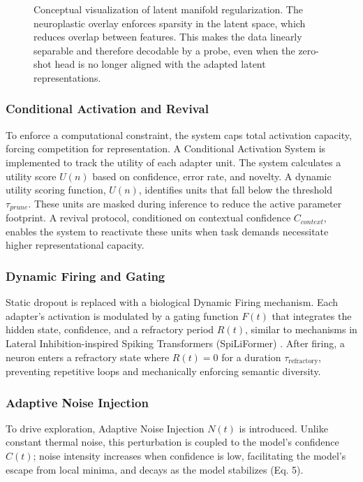 \documentclass[11pt, letterpaper]{article}
\begin{document}
\begin{figure}[htbp]
\centering
\caption{Conceptual visualization of latent manifold regularization. The neuroplastic overlay enforces sparsity in the latent space, which reduces overlap between features. This makes the data linearly separable and therefore decodable by a probe, even when the zero-shot head is no longer aligned with the adapted latent representations.}
\label{fig:manifold_concept}
\end{figure}

\subsubsection{Conditional Activation and Revival}
To enforce a computational constraint, the system caps total activation capacity, forcing competition for representation. A Conditional Activation System is implemented to track the utility of each adapter unit. The system calculates a utility score $U(n)$ based on confidence, error rate, and novelty. A dynamic utility scoring function, $U(n)$, identifies units that fall below the threshold $\tau_{prune}$. These units are masked during inference to reduce the active parameter footprint. A revival protocol, conditioned on contextual confidence $C_{context}$, enables the system to reactivate these units when task demands necessitate higher representational capacity.

\subsubsection{Dynamic Firing and Gating}
Static dropout is replaced with a biological Dynamic Firing mechanism. Each 
adapter's activation is modulated by a gating function $F(t)$ that integrates the hidden state, confidence, and a refractory period $R(t)$, similar to mechanisms in Lateral Inhibition-inspired Spiking Transformers (SpiLiFormer) \cite{spiliformer}. After firing, a neuron enters a refractory state where $R(t)=0$ for a duration $\tau_{\text{refractory}}$, preventing repetitive loops and mechanically enforcing semantic diversity.

\subsubsection{Adaptive Noise Injection}
To drive exploration, Adaptive Noise Injection $N(t)$ is introduced. Unlike 
constant thermal noise, this perturbation is coupled to the model's confidence $C(t)$; noise intensity increases when confidence is low, facilitating the model's escape from local minima, and decays as the model stabilizes (Eq. 5).
\end{document}
